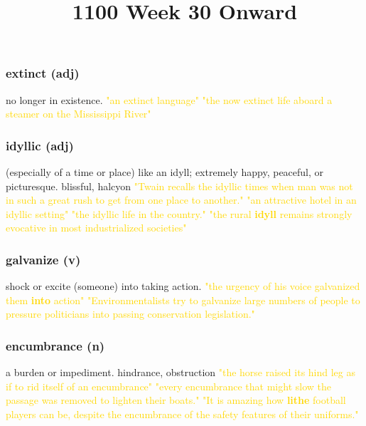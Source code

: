 \documentclass{proc}
\title{1100 Week 30 Onward}
\begin{document}
	\setcounter{section}{30}
		\subsection{}
			\subsubsection{\textcolor{brickred}{extinct} (adj)}
			 no longer in existence.
			 \textcolor{gold}{"an extinct language"
			 "the now extinct life aboard a 
			 steamer on the Mississippi River"}
			 
			 \subsubsection{\textcolor{brickred}{idyllic} (adj)}
			 (especially of a time or place) like an idyll; extremely happy, peaceful, or picturesque. blissful, halcyon
			 \textcolor{gold}{"Twain recalls the idyllic times when man 
			 was not in such a great rush to get from one place to another."
			 "an attractive hotel in an idyllic setting"
			 "the idyllic life in the country."
			 "the rural \textbf{idyll} remains strongly evocative in most industrialized societies"}
			 
			 \subsubsection{\textcolor{brickred}{galvanize} (v)}
			 shock or excite (someone) into taking action.
			 \textcolor{gold}{"the urgency of his voice galvanized them \textbf{into} action"
			 "Environmentalists try to galvanize large numbers of people to pressure politicians into passing conservation legislation."}

			 
			 \subsubsection{\textcolor{brickred}{encumbrance} (n)}
			 a burden or impediment. hindrance, obstruction
			 \textcolor{gold}{"the horse raised its hind leg as if to rid itself of an encumbrance"
			 "every encumbrance that might slow the passage was removed to lighten their boats."
			 "It is amazing how \textbf{lithe} football players can be, despite the encumbrance of the
			 safety features of their uniforms."}
			 
\end{document}
